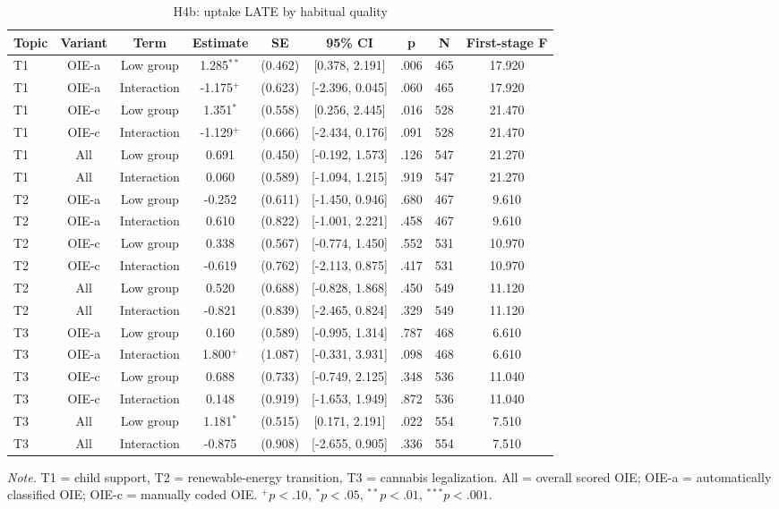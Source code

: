 \begin{table}[htbp]
\centering
\begin{threeparttable}
\caption{H4b: uptake LATE by habitual quality}
\label{tab:tab_h4b_late_interaction}
\begin{tabular}{lcccccccc}
\toprule
  Topic & Variant & Term & Estimate & SE & 95\% CI & p & N & First-stage F \\
\midrule
  T1 & OIE-a & Low group & 1.285$^{**}$ & (0.462) & [0.378, 2.191] & .006 & 465 & 17.920 \\
  T1 & OIE-a & Interaction & -1.175$^{+}$ & (0.623) & [-2.396, 0.045] & .060 & 465 & 17.920 \\
  T1 & OIE-c & Low group & 1.351$^{*}$ & (0.558) & [0.256, 2.445] & .016 & 528 & 21.470 \\
  T1 & OIE-c & Interaction & -1.129$^{+}$ & (0.666) & [-2.434, 0.176] & .091 & 528 & 21.470 \\
  T1 & All & Low group & 0.691 & (0.450) & [-0.192, 1.573] & .126 & 547 & 21.270 \\
  T1 & All & Interaction & 0.060 & (0.589) & [-1.094, 1.215] & .919 & 547 & 21.270 \\
  T2 & OIE-a & Low group & -0.252 & (0.611) & [-1.450, 0.946] & .680 & 467 & 9.610 \\
  T2 & OIE-a & Interaction & 0.610 & (0.822) & [-1.001, 2.221] & .458 & 467 & 9.610 \\
  T2 & OIE-c & Low group & 0.338 & (0.567) & [-0.774, 1.450] & .552 & 531 & 10.970 \\
  T2 & OIE-c & Interaction & -0.619 & (0.762) & [-2.113, 0.875] & .417 & 531 & 10.970 \\
  T2 & All & Low group & 0.520 & (0.688) & [-0.828, 1.868] & .450 & 549 & 11.120 \\
  T2 & All & Interaction & -0.821 & (0.839) & [-2.465, 0.824] & .329 & 549 & 11.120 \\
  T3 & OIE-a & Low group & 0.160 & (0.589) & [-0.995, 1.314] & .787 & 468 & 6.610 \\
  T3 & OIE-a & Interaction & 1.800$^{+}$ & (1.087) & [-0.331, 3.931] & .098 & 468 & 6.610 \\
  T3 & OIE-c & Low group & 0.688 & (0.733) & [-0.749, 2.125] & .348 & 536 & 11.040 \\
  T3 & OIE-c & Interaction & 0.148 & (0.919) & [-1.653, 1.949] & .872 & 536 & 11.040 \\
  T3 & All & Low group & 1.181$^{*}$ & (0.515) & [0.171, 2.191] & .022 & 554 & 7.510 \\
  T3 & All & Interaction & -0.875 & (0.908) & [-2.655, 0.905] & .336 & 554 & 7.510 \\
\bottomrule
\end{tabular}
\begin{tablenotes}\footnotesize\item \textit{Note.} T1 = child support, T2 = renewable-energy transition, T3 = cannabis legalization. All = overall scored OIE; OIE-a = automatically classified OIE; OIE-c = manually coded OIE. $^{+}p<.10$, $^{*}p<.05$, $^{**}p<.01$, $^{***}p<.001$.\end{tablenotes}
\end{threeparttable}
\end{table}
